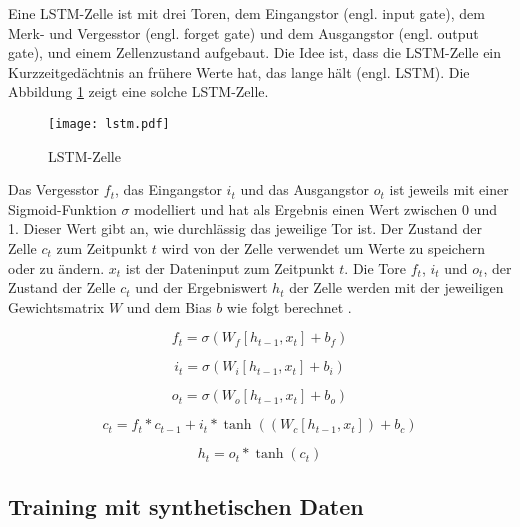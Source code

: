 Eine \ac{LSTM}-Zelle ist mit drei Toren, dem Eingangstor (engl. input gate), dem Merk- und Vergesstor (engl. forget gate) und dem Ausgangstor (engl. output gate), und einem Zellenzustand aufgebaut. Die Idee ist, dass die \ac{LSTM}-Zelle ein Kurzzeitgedächtnis an frühere Werte hat, das lange hält (engl. \acl{LSTM}). Die Abbildung \ref{fig_lstm} zeigt eine solche \ac{LSTM}-Zelle.

\begin{figure}[h]
\centering
\texttt{[image: lstm.pdf]}
\caption{\acl{LSTM}-Zelle \cite{olah2015lstm}}
\label{fig_lstm}
\end{figure}

Das Vergesstor $f_t$, das Eingangstor $i_t$ und das Ausgangstor $o_t$ ist jeweils mit einer Sigmoid-Funktion $\sigma$ modelliert und hat als Ergebnis einen Wert zwischen 0 und 1. Dieser Wert gibt an, wie durchlässig das jeweilige Tor ist. Der Zustand der Zelle $c_t$ zum Zeitpunkt $t$ wird von der Zelle verwendet um Werte zu speichern oder zu ändern. $x_t$ ist der Dateninput zum Zeitpunkt $t$. Die Tore $f_t$, $i_t$ und $o_t$, der Zustand der Zelle $c_t$ und der Ergebniswert $h_t$ der Zelle werden mit der jeweiligen Gewichtsmatrix $W$ und dem Bias $b$ wie folgt berechnet \cite{olah2015lstm}.

\begin{equation}
f_t = \sigma (W_f[h_{t-1}, x_t] + b_f)
\end{equation}

\begin{equation}
i_t = \sigma (W_i[h_{t-1}, x_t] + b_i)
\end{equation}

\begin{equation}
o_t = \sigma (W_o[h_{t-1}, x_t] + b_o)
\end{equation}

\begin{equation}
c_t = f_t * c_{t-1} + i_t * \tanh((W_c[h_{t-1}, x_t]) + b_c)
\end{equation}

\begin{equation}
h_t = o_t * \tanh(c_t)
\end{equation}


\subsection{Training mit synthetischen Daten}
\label{grundlagen_nn_synthetisch}

